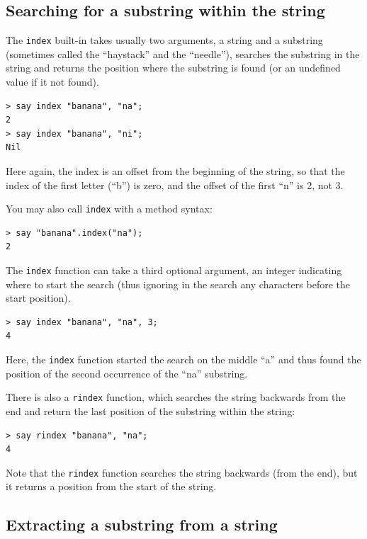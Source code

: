 \subsection{Searching for a substring within the string}

\label{find}

The {\tt index} built-in takes usually two arguments, a string 
and a substring (sometimes called the ``haystack'' and 
the ``needle''), 
searches the substring in the string and returns the position 
where the substring is found (or an undefined value if it not
found). 

\begin{verbatim}
> say index "banana", "na";
2
> say index "banana", "ni";
Nil
\end{verbatim}
%

Here again, the index is an offset from the beginning of the 
string, so that the index of the first letter (``b'') is zero, 
and the offset of the first ``n'' is 2, not 3.

You may also call {\tt index} with a method syntax:
\begin{verbatim}
> say "banana".index("na");
2
\end{verbatim}
%

The {\tt index} function can take a third optional argument, an integer indicating where to start the search (thus ignoring 
in the search any characters before the start position).

\begin{verbatim}
> say index "banana", "na", 3;
4
\end{verbatim}
%
Here, the {\tt index} function started the search on the middle ``a'' and thus found the position of the second occurrence of 
the ``na'' substring.

There is also a {\tt rindex} function, which searches the string 
backwards from the end and return the last position of the 
substring within the string:

\begin{verbatim}
> say rindex "banana", "na";
4
\end{verbatim}
%

Note that the {\tt rindex} function searches the string 
backwards (from the end), but it returns a position from 
the start of the string.

\subsection{Extracting a substring from a string}

